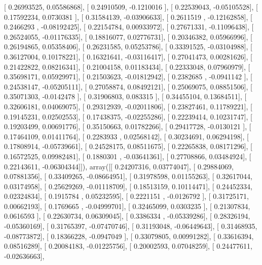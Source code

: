 \documentclass{article}
\begin{document}
       [ 0.26993525,  0.05586868],
       [ 0.24910509, -0.1210016 ],
       [ 0.22539043, -0.05105528],
       [ 0.17592234,  0.0730381 ],
       [ 0.31584139, -0.03906633],
       [ 0.2611519 , -0.12162858],
       [ 0.2466293 , -0.08192425],
       [ 0.22154784,  0.00933972],
       [ 0.27671331, -0.11096438],
       [ 0.26524055, -0.01176335],
       [ 0.18816077,  0.02776731],
       [ 0.20346382,  0.05966996],
       [ 0.26194865,  0.05358406],
       [ 0.26231585,  0.05253786],
       [ 0.33391525, -0.03104988],
       [ 0.36127004,  0.10178221],
       [ 0.16321641, -0.03116417],
       [ 0.27041473,  0.00281626],
       [ 0.21422822,  0.08216341],
       [ 0.21004158,  0.01183434],
       [ 0.22333048,  0.07960979],
       [ 0.35698171,  0.05929971],
       [ 0.21503623, -0.01812942],
       [ 0.2382685 , -0.0941142 ],
       [ 0.24538147, -0.05205111],
       [ 0.27058874,  0.08492121],
       [ 0.25069075,  0.08851506],
       [ 0.35071303, -0.0142478 ],
       [ 0.31906803,  0.083315  ],
       [ 0.34455104,  0.13684511],
       [ 0.32606181,  0.04069075],
       [ 0.29312939, -0.02011806],
       [ 0.23827461,  0.11789221],
       [ 0.19145231,  0.02502553],
       [ 0.17438375, -0.02255286],
       [ 0.22239414,  0.10231747],
       [ 0.19203499,  0.00691776],
       [ 0.35150663,  0.01782266],
       [ 0.29417728, -0.0130121 ],
       [ 0.17464109,  0.01411764],
       [ 0.2283933 ,  0.02568142],
       [ 0.30234691,  0.06294198],
       [ 0.17808914, -0.05739661],
       [ 0.24528175,  0.08511675],
       [ 0.22265838,  0.08171296],
       [ 0.16572525,  0.09982481],
       [ 0.1880301 , -0.03641361],
       [ 0.27708866,  0.03484924],
       [ 0.22143611, -0.06304344]]), array([[ 0.24207316,  0.03774047],
       [ 0.29884069,  0.07881356],
       [ 0.33409265, -0.08664951],
       [ 0.31978598,  0.01155263],
       [ 0.32617044,  0.03174958],
       [ 0.25629269, -0.01118709],
       [ 0.18513159,  0.10114471],
       [ 0.24452334,  0.02324834],
       [ 0.1915784 ,  0.05232595],
       [ 0.2221151 , -0.0126792 ],
       [ 0.31725171,  0.00662193],
       [ 0.1769665 , -0.04999701],
       [ 0.32465099,  0.0303235 ],
       [ 0.21307834,  0.0616593 ],
       [ 0.22630734,  0.06309045],
       [ 0.3386334 , -0.05339286],
       [ 0.28326194, -0.05360169],
       [ 0.31765397, -0.07470746],
       [ 0.31193048, -0.06449643],
       [ 0.31468935, -0.08773872],
       [ 0.18366228, -0.0947049 ],
       [ 0.33079805,  0.00991282],
       [ 0.33616394,  0.08516289],
       [ 0.20084183, -0.01225756],
       [ 0.20002593,  0.07048259],
       [ 0.24477611, -0.02636663],
\end{document}
